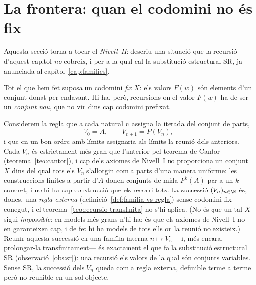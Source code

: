 \section{La frontera: quan el codomini no és fix}\label{sec:frontera-sr}

\begin{nota}
Aquesta secció torna a tocar el \emph{Nivell~II}: descriu una situació
que la recursió d'aquest capítol \emph{no} cobreix, i per a la qual cal la
substitució estructural SR, ja anunciada al capítol~\ref{cap:families}.
\end{nota}

Tot el que hem fet suposa un codomini \emph{fix} \(X\): els valors \(F(w)\)
són elements d'un conjunt donat per endavant. Hi ha, però, recursions on el
valor \(F(w)\) ha de ser un \emph{conjunt nou}, que no viu dins cap codomini
prefixat.

\begin{observacio}\label{obs:frontera-exemple}
Considerem la regla que a cada natural \(n\) assigna la iterada del conjunt de
parts,
\[
V_0=A,
\qquad
V_{n+1}=P(V_n),
\]
i que en un bon ordre amb límits assignaria als límits la reunió dels
anteriors. Cada \(V_{n}\) és estrictament més gran que l'anterior pel teorema
de Cantor (teorema~\ref{teo:cantor}), i cap dels axiomes de Nivell~I no
proporciona un conjunt \(X\) dins del qual tots els \(V_n\) s'allotgin com
a parts d'una manera uniforme: les construccions finites a partir d'\(A\)
donen conjunts de mida \(P^k(A)\) per a un \(k\) concret, i no hi ha cap
construcció que els recorri tots. La successió \((V_n)_{n\in\N}\) és, doncs,
una \emph{regla externa} (definició~\ref{def:familia-vs-regla}) sense
codomini fix conegut, i el teorema~\ref{teo:recursio-transfinita} no s'hi
aplica. (No és que un tal \(X\) sigui \emph{impossible}: en models més
grans n'hi ha; és que els axiomes de Nivell~I no en garanteixen cap, i de
fet hi ha models de tots ells on la reunió no existeix.) Reunir aquesta successió en una família interna
\(n\mapsto V_n\) ---i, més encara, prolongar-la transfinitament--- és
exactament el que fa la substitució estructural SR
(observació~\ref{obs:sr}): una recursió els valors de la qual són conjunts
variables. Sense SR, la successió dels \(V_n\) queda com a regla externa,
definible terme a terme però no reunible en un sol objecte.
\end{observacio}


